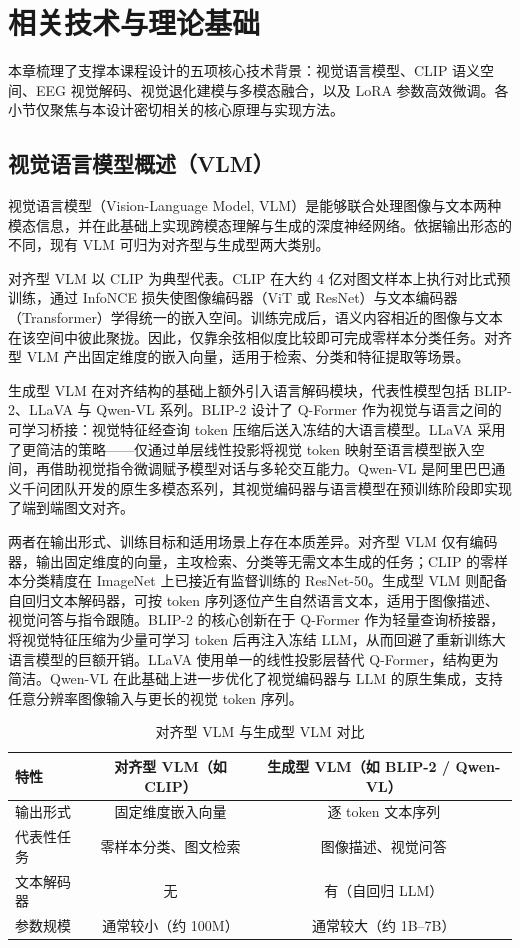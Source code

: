 \section{相关技术与理论基础}

本章梳理了支撑本课程设计的五项核心技术背景：视觉语言模型、CLIP 语义空间、EEG 视觉解码、视觉退化建模与多模态融合，以及 LoRA 参数高效微调。各小节仅聚焦与本设计密切相关的核心原理与实现方法。

\subsection{视觉语言模型概述（VLM）}

视觉语言模型（Vision-Language Model, VLM）是能够联合处理图像与文本两种模态信息，并在此基础上实现跨模态理解与生成的深度神经网络。依据输出形态的不同，现有 VLM 可归为对齐型与生成型两大类别。

对齐型 VLM 以 CLIP 为典型代表。CLIP 在大约 4 亿对图文样本上执行对比式预训练，通过 InfoNCE 损失使图像编码器（ViT 或 ResNet）与文本编码器（Transformer）学得统一的嵌入空间。训练完成后，语义内容相近的图像与文本在该空间中彼此聚拢。因此，仅靠余弦相似度比较即可完成零样本分类任务。对齐型 VLM 产出固定维度的嵌入向量，适用于检索、分类和特征提取等场景。

生成型 VLM 在对齐结构的基础上额外引入语言解码模块，代表性模型包括 BLIP-2、LLaVA 与 Qwen-VL 系列。BLIP-2 设计了 Q-Former 作为视觉与语言之间的可学习桥接：视觉特征经查询 token 压缩后送入冻结的大语言模型。LLaVA 采用了更简洁的策略——仅通过单层线性投影将视觉 token 映射至语言模型嵌入空间，再借助视觉指令微调赋予模型对话与多轮交互能力。Qwen-VL 是阿里巴巴通义千问团队开发的原生多模态系列，其视觉编码器与语言模型在预训练阶段即实现了端到端图文对齐。

两者在输出形式、训练目标和适用场景上存在本质差异。对齐型 VLM 仅有编码器，输出固定维度的向量，主攻检索、分类等无需文本生成的任务；CLIP 的零样本分类精度在 ImageNet 上已接近有监督训练的 ResNet-50。生成型 VLM 则配备自回归文本解码器，可按 token 序列逐位产生自然语言文本，适用于图像描述、视觉问答与指令跟随。BLIP-2 的核心创新在于 Q-Former 作为轻量查询桥接器，将视觉特征压缩为少量可学习 token 后再注入冻结 LLM，从而回避了重新训练大语言模型的巨额开销。LLaVA 使用单一的线性投影层替代 Q-Former，结构更为简洁。Qwen-VL 在此基础上进一步优化了视觉编码器与 LLM 的原生集成，支持任意分辨率图像输入与更长的视觉 token 序列。

\begin{table}[h]
\centering
\caption{对齐型 VLM 与生成型 VLM 对比}
\label{tab:vlm-comparison}
\begin{tabular}{lcc}
\toprule
特性 & 对齐型 VLM（如 CLIP） & 生成型 VLM（如 BLIP-2 / Qwen-VL） \\
\midrule
输出形式 & 固定维度嵌入向量 & 逐 token 文本序列 \\
代表性任务 & 零样本分类、图文检索 & 图像描述、视觉问答 \\
文本解码器 & 无 & 有（自回归 LLM） \\
参数规模 & 通常较小（约 100M） & 通常较大（约 1B--7B） \\
\bottomrule
\end{tabular}
\end{table}

